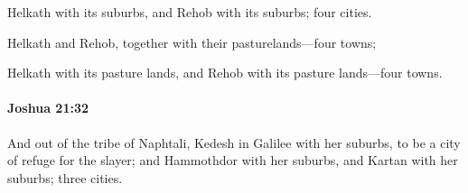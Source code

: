 			\begin{versebox}
					\item[BHS] 
					\item[ASV] Helkath with its suburbs, and Rehob with its suburbs; four cities.
					\item[NIV] Helkath and Rehob, together with their pasturelands—four towns;
					\item[NRSV] Helkath with its pasture lands, and Rehob with its pasture lands—four towns.
			\end{versebox}

		\paragraph{Joshua 21:32} %
			\label{JOSHUA-21-32}

			And out of the tribe of Naphtali, Kedesh in Galilee with her suburbs, to be a city of refuge for the slayer; and Hammothdor with her suburbs, and Kartan with her suburbs; three cities.

